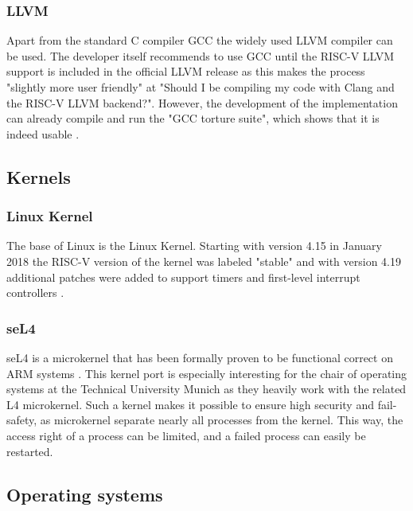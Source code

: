 \subsubsection{LLVM}
Apart from the standard C compiler GCC
the widely used LLVM compiler can be used.
The developer itself recommends
to use GCC until the RISC-V LLVM support
is included in the official LLVM release
as this makes the process "slightly more
user friendly" \cite{github_risc-v_llvm} at
"Should I be compiling my code with Clang and
the RISC-V LLVM backend?".
However, the development of the implementation
can already compile and run the
"GCC torture suite", which shows that
it is indeed usable \cite{github_risc-v_llvm}.

\subsection{Kernels}
\subsubsection{Linux Kernel}
The base of Linux is the Linux Kernel. Starting
with version 4.15 in January 2018 the RISC-V version
of the kernel was labeled "stable" 
\cite{github_risc-v_linux_kernel} and with version
4.19 additional patches were added to support
timers and first-level interrupt controllers
\cite{poronix_linux_kernel}.

\subsubsection{seL4}
seL4 is a microkernel that has been formally proven
to be functional correct on ARM systems 
\cite{sel4_enforces_integrity}. This kernel port is especially
interesting for the chair of operating systems at the
Technical University Munich as they heavily work with
the related L4 microkernel.
Such a kernel makes it possible to ensure high security
and fail-safety, as microkernel separate nearly all
processes from the kernel.
This way, the access right of a process can be limited,
and a failed process can easily be restarted.

\subsection{Operating systems}

